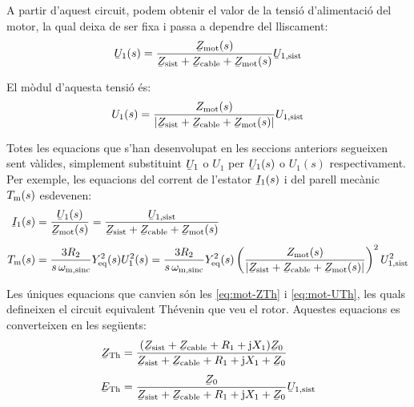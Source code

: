 A partir d'aquest circuit, podem obtenir  el valor de la tensió d'alimentació del motor, la qual deixa de ser fixa i passa a dependre del  lliscament:
\begin{equation}
	\cmplx{U}_1(s) = \frac{\cmplx{Z}\ped{mot}(s)}{\cmplx{Z}\ped{sist} + \cmplx{Z}\ped{cable} +  \cmplx{Z}\ped{mot}(s)} \cmplx{U}\ped{1,sist}\label{eq:mot-U-redu}
\end{equation}

El mòdul d'aquesta tensió és:
\begin{equation}
	U_1(s) = \frac{Z\ped{mot}(s)}{|\cmplx{Z}\ped{sist} + \cmplx{Z}\ped{cable} +  \cmplx{Z}\ped{mot}(s)|} U\ped{1,sist}
\end{equation}

Totes les equacions que s'han desenvolupat en les seccions anteriors segueixen sent vàlides, simplement substituint $\cmplx{U}_1$ o $U_1$ per  $\cmplx{U}_1(s)$ o $U_1(s)$ respectivament. Per exemple, les equacions del corrent de l'estator $\cmplx{I}_1(s)$ i del parell mecànic $T_\mathrm{m}(s)$ esdevenen:
\begin{subequations}
	\begin{align}
	\cmplx{I}_1(s) &= \frac{\cmplx{U}_1(s)}{\cmplx{Z}\ped{mot}(s)} = \frac{\cmplx{U}\ped{1,sist}}{\cmplx{Z}\ped{sist} + \cmplx{Z}\ped{cable} +  \cmplx{Z}\ped{mot}(s)} \label{eq:mot-I-redu} \\[1ex]
	T\ped{m}(s)  &= \frac{3 R_2}{s\,\omega\ped{m,sinc}} Y\ped{eq}^2(s) U_1^2(s) =
	\frac{3 R_2}{s\,\omega\ped{m,sinc}} Y\ped{eq}^2(s) \left(\frac{Z\ped{mot}(s)}{|\cmplx{Z}\ped{sist} + \cmplx{Z}\ped{cable} +  \cmplx{Z}\ped{mot}(s)|} \right)^2 U\ped{1,sist}^2 \label{eq:mot-Tm-redu}
	\end{align}
\end{subequations}

Les úniques equacions que canvien són les \eqref{eq:mot-ZTh} i  \eqref{eq:mot-UTh}, les quals defineixen el circuit  equivalent Thévenin que veu el rotor. Aquestes equacions es converteixen en les següents:
\begin{subequations}
	\begin{align}
	\cmplx{Z}\ped{Th} &= \frac{(\cmplx{Z}\ped{sist} + \cmplx{Z}\ped{cable} + R_1 + \ju X_1) \cmplx{Z}_0}{\cmplx{Z}\ped{sist} + \cmplx{Z}\ped{cable} + R_1 + \ju X_1 + \cmplx{Z}_0} \label{eq:mot-ZTh-redu}\\[1ex]
	\cmplx{E}\ped{Th} &= \frac{\cmplx{Z}_0}{\cmplx{Z}\ped{sist} + \cmplx{Z}\ped{cable} + R_1 + \ju X_1 + \cmplx{Z}_0} \cmplx{U}\ped{1,sist} \label{eq:mot-UTh-redu}
	\end{align}
\end{subequations}

